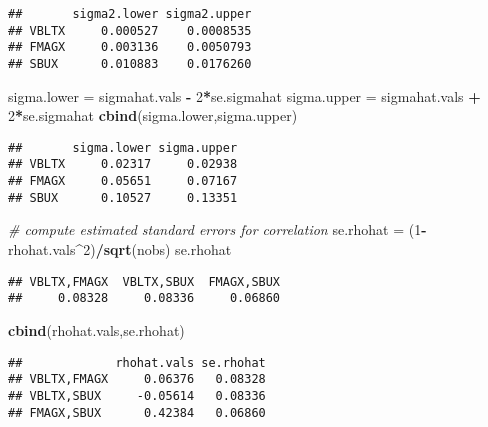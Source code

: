 \documentclass[]{article}
\newenvironment{Shaded}{\begin{snugshade}}{\end{snugshade}}
\newcommand{\KeywordTok}[1]{\textcolor[rgb]{0.13,0.29,0.53}{\textbf{#1}}}
\newcommand{\DecValTok}[1]{\textcolor[rgb]{0.00,0.00,0.81}{#1}}
\newcommand{\StringTok}[1]{\textcolor[rgb]{0.31,0.60,0.02}{#1}}
\newcommand{\CommentTok}[1]{\textcolor[rgb]{0.56,0.35,0.01}{\textit{#1}}}
\newcommand{\OperatorTok}[1]{\textcolor[rgb]{0.81,0.36,0.00}{\textbf{#1}}}
\newcommand{\NormalTok}[1]{#1}
\begin{document}
\begin{verbatim}
##       sigma2.lower sigma2.upper
## VBLTX     0.000527    0.0008535
## FMAGX     0.003136    0.0050793
## SBUX      0.010883    0.0176260
\end{verbatim}

\begin{Shaded}
\begin{Highlighting}[]
\NormalTok{sigma.lower =}\StringTok{ }\NormalTok{sigmahat.vals }\OperatorTok{-}\StringTok{ }\DecValTok{2}\OperatorTok{*}\NormalTok{se.sigmahat}
\NormalTok{sigma.upper =}\StringTok{ }\NormalTok{sigmahat.vals }\OperatorTok{+}\StringTok{ }\DecValTok{2}\OperatorTok{*}\NormalTok{se.sigmahat}
\KeywordTok{cbind}\NormalTok{(sigma.lower,sigma.upper)}
\end{Highlighting}
\end{Shaded}

\begin{verbatim}
##       sigma.lower sigma.upper
## VBLTX     0.02317     0.02938
## FMAGX     0.05651     0.07167
## SBUX      0.10527     0.13351
\end{verbatim}

\begin{Shaded}
\begin{Highlighting}[]
\CommentTok{# compute estimated standard errors for correlation}
\NormalTok{se.rhohat =}\StringTok{ }\NormalTok{(}\DecValTok{1}\OperatorTok{-}\NormalTok{rhohat.vals}\OperatorTok{^}\DecValTok{2}\NormalTok{)}\OperatorTok{/}\KeywordTok{sqrt}\NormalTok{(nobs)}
\NormalTok{se.rhohat}
\end{Highlighting}
\end{Shaded}

\begin{verbatim}
## VBLTX,FMAGX  VBLTX,SBUX  FMAGX,SBUX 
##     0.08328     0.08336     0.06860
\end{verbatim}

\begin{Shaded}
\begin{Highlighting}[]
\KeywordTok{cbind}\NormalTok{(rhohat.vals,se.rhohat)}
\end{Highlighting}
\end{Shaded}

\begin{verbatim}
##             rhohat.vals se.rhohat
## VBLTX,FMAGX     0.06376   0.08328
## VBLTX,SBUX     -0.05614   0.08336
## FMAGX,SBUX      0.42384   0.06860
\end{verbatim}
\end{document}
